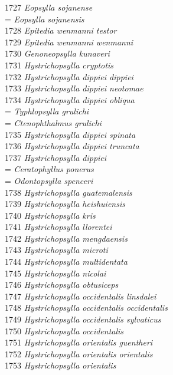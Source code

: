 \documentclass[
]{article}
\begin{document}
1727 \emph{Eopsylla sojanense}\\
= \emph{Eopsylla sojanensis}\\
1728 \emph{Epitedia wenmanni testor}\\
1729 \emph{Epitedia wenmanni wenmanni}\\
1730 \emph{Genoneopsylla kunaveri}\\
1731 \emph{Hystrichopsylla cryptotis}\\
1732 \emph{Hystrichopsylla dippiei dippiei}\\
1733 \emph{Hystrichopsylla dippiei neotomae}\\
1734 \emph{Hystrichopsylla dippiei obliqua}\\
= \emph{Typhlopsylla grulichi}\\
= \emph{Ctenophthalmus grulichi}\\
1735 \emph{Hystrichopsylla dippiei spinata}\\
1736 \emph{Hystrichopsylla dippiei truncata}\\
1737 \emph{Hystrichopsylla dippiei}\\
= \emph{Ceratophyllus ponerus}\\
= \emph{Odontopsylla spenceri}\\
1738 \emph{Hystrichopsylla guatemalensis}\\
1739 \emph{Hystrichopsylla heishuiensis}\\
1740 \emph{Hystrichopsylla kris}\\
1741 \emph{Hystrichopsylla llorentei}\\
1742 \emph{Hystrichopsylla mengdaensis}\\
1743 \emph{Hystrichopsylla microti}\\
1744 \emph{Hystrichopsylla multidentata}\\
1745 \emph{Hystrichopsylla nicolai}\\
1746 \emph{Hystrichopsylla obtusiceps}\\
1747 \emph{Hystrichopsylla occidentalis linsdalei}\\
1748 \emph{Hystrichopsylla occidentalis occidentalis}\\
1749 \emph{Hystrichopsylla occidentalis sylvaticus}\\
1750 \emph{Hystrichopsylla occidentalis}\\
1751 \emph{Hystrichopsylla orientalis guentheri}\\
1752 \emph{Hystrichopsylla orientalis orientalis}\\
1753 \emph{Hystrichopsylla orientalis}\\
\end{document}
